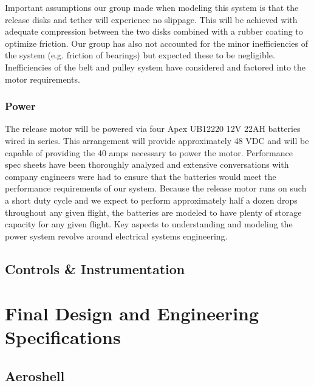 Important assumptions our group made when modeling this system is that the release disks and tether will experience no slippage. This will be achieved with adequate compression between the two disks combined with a rubber coating to optimize friction. Our group has also not accounted for the minor inefficiencies of the system (e.g. friction of bearings) but expected these to be negligible. Inefficiencies of the belt and pulley system have considered and factored into the motor requirements. 

\subsubsection{Power}

\indent\indent The release motor will be powered via four Apex UB12220 12V 22AH batteries wired in series. This arrangement will provide approximately 48 VDC and will be capable of providing the 40 amps necessary to power the motor. Performance spec sheets have been thoroughly analyzed and extensive conversations with company engineers were had to ensure that the batteries would meet the performance requirements of our system. Because the release motor runs on such a short duty cycle and we expect to perform approximately half a dozen drops throughout any given flight, the batteries are modeled to have plenty of storage capacity for any given flight. Key aspects to understanding and modeling the power system revolve around electrical systems engineering.

\subsection{Controls \& Instrumentation}




\section{Final Design and Engineering Specifications}

\subsection{Aeroshell}

